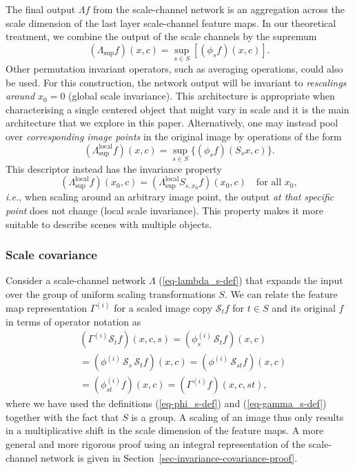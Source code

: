 \documentclass[twocolumn,runningheads]{svjour3}
\def\calS{\mathcal{S}}
\newcommand{\local}{\operatorname{local}}
\begin{document}
The final output $\Lambda f$ from the scale-channel network is an
aggregation across the scale dimension of the last layer scale-channel
feature maps. In our theoretical treatment, we combine the output of
the scale channels by the supremum
\begin{equation}
(\Lambda_{\sup} f)(x,c) = \sup_{s \in S} \left[  ( \phi_s f)(x,c) \right]
\label{eq-lambda_s-def}.
\end{equation}
Other permutation invariant operators, such as averaging operations,
could also be used. For this construction, the network output will be
invariant to {\em rescalings around $x_0=0$\/}
(global scale invariance). This architecture is appropriate  when
characterising a single centered object that might vary in scale and
it is the main architecture that we explore in this paper. 
Alternatively, one may instead pool over 
{\em corresponding image points\/} in the original image 
by operations of the form
\begin{equation}
\label{eq-lambda_s-skewed-def}
(\Lambda_{\sup}^{\local} f)(x, c) = \sup_{s \in S} \{ (\phi_s f)(S_s x, c) \}.
\end{equation}
This descriptor instead has the invariance property
\begin{equation}
  (\Lambda_{\sup}^{\local} f)(x_0, c) = (\Lambda_{\sup}^{\local} S_{s,
    x_0}f)(x_0, c) \quad \mbox{for all $x_0$},
\end{equation}
{\em i.e.\/}, when scaling around an
arbitrary image point, the output {\em at that specific point\/} does
not change (local scale invariance). This property makes it more
suitable to describe scenes with multiple objects. 

\subsubsection{Scale covariance}

Consider a scale-channel network $\Lambda$ (\ref{eq-lambda_s-def})
that expands the input over the group of uniform scaling transformations $S$. 
We can relate the feature map representation $\Gamma^{(i)}$ 
for a scaled image copy $\calS_t f$ for $t \in S$ and its original $f$
in terms of operator notation as
\begin{align}
&(\Gamma^{(i)} \calS_t f)(x,c,s) = (\phi_s^{(i)} \, \calS_t f)(x,c) \nonumber\\ 
&=(\phi^{(i)} \, \calS_s \, \calS_t f)(x,c) = (\phi^{(i)} \, \calS_{s t} f)(x,c) \nonumber\\ 
&= (\phi_{st}^{(i)} f)(x,c) = (\Gamma^{(i)} f)(x,c, s t),
\label{eq-scale-covariance}
\end{align}
where we have used the definitions (\ref{eq-phi_s-def}) and
(\ref{eq-gamma_s-def}) together with the fact that $S$ is a group. A
scaling of an image thus only results in a multiplicative shift in the
scale dimension of the feature maps. A more general and more rigorous
proof using an integral representation of the scale-channel network is
given in Section~\ref{sec-invariance-covariance-proof}. 
\end{document}
